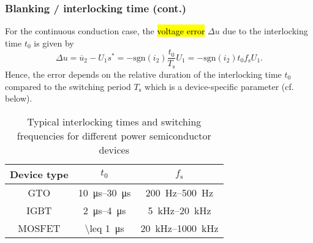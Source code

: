 \begin{frame}
    \frametitle{Blanking / interlocking time (cont.)} 
        For the continuous conduction case, the \hl{voltage error} $\Delta u$ due to the interlocking time $t_0$ is given by
        \begin{equation}
            \Delta u =\overline{u}_2 - U_1s^* = -\mathrm{sgn}(i_2)\frac{t_0}{T_\mathrm{s}}  U_1= -\mathrm{sgn}(i_2)t_0 f_\mathrm{s} U_1.
        \end{equation}
        \pause
        Hence, the error depends on the relative duration of the interlocking time $t_0$ compared to the switching period $T_\mathrm{s}$ which is a device-specific parameter (cf. below). 
        
        \begin{table}
            \begin{tabular}{c c c}
                \toprule
                Device type & $t_0$ & $f_\mathrm{s}$ \\
                \midrule
                GTO & \SIrange{10}{30}{\micro\second} & \SIrange{200}{500}{\hertz} \\
                IGBT & \SIrange{2}{4}{\micro\second} & \SIrange{5}{20}{\kilo\hertz} \\
                MOSFET & \SI{\leq 1}{\micro\second} & \SIrange{20}{1000}{\kilo\hertz} \\
                \bottomrule
            \end{tabular}
            \caption{Typical interlocking times and switching frequencies for different power semiconductor devices}
            \label{tab:interlocking_times}
        \end{table}
\end{frame}

